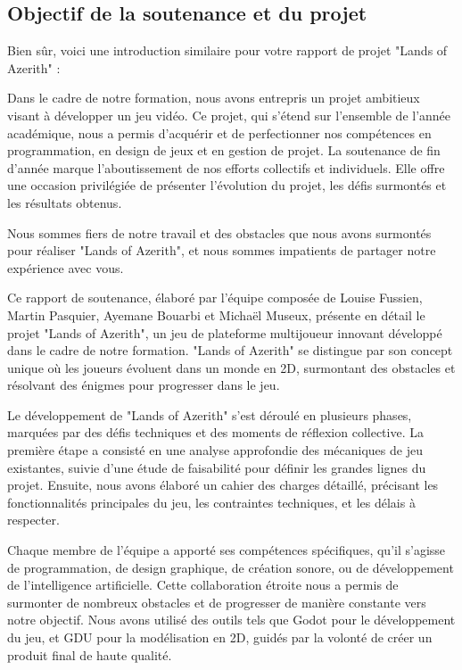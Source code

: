 

\subsection{Objectif de la soutenance et du projet}

Bien sûr, voici une introduction similaire pour votre rapport de projet "Lands of Azerith" :

Dans le cadre de notre formation, nous avons entrepris un projet ambitieux visant à développer un jeu vidéo. Ce projet, qui s'étend sur l'ensemble de l'année académique, nous a permis d'acquérir et de perfectionner nos compétences en programmation, en design de jeux et en gestion de projet. La soutenance de fin d'année marque l'aboutissement de nos efforts collectifs et individuels. Elle offre une occasion privilégiée de présenter l'évolution du projet, les défis surmontés et les résultats obtenus.

Nous sommes fiers de notre travail et des obstacles que nous avons surmontés pour réaliser "Lands of Azerith", et nous sommes impatients de partager notre expérience avec vous.


Ce rapport de soutenance, élaboré par l'équipe composée de Louise Fussien, Martin Pasquier, Ayemane Bouarbi et Michaël Museux, présente en détail le projet "Lands of Azerith", un jeu de plateforme multijoueur innovant développé dans le cadre de notre formation. "Lands of Azerith" se distingue par son concept unique où les joueurs évoluent dans un monde en 2D, surmontant des obstacles et résolvant des énigmes pour progresser dans le jeu.


Le développement de "Lands of Azerith" s'est déroulé en plusieurs phases, marquées par des défis techniques et des moments de réflexion collective. La première étape a consisté en une analyse approfondie des mécaniques de jeu existantes, suivie d'une étude de faisabilité pour définir les grandes lignes du projet. Ensuite, nous avons élaboré un cahier des charges détaillé, précisant les fonctionnalités principales du jeu, les contraintes techniques, et les délais à respecter.

Chaque membre de l'équipe a apporté ses compétences spécifiques, qu'il s'agisse de programmation, de design graphique, de création sonore, ou de développement de l'intelligence artificielle. Cette collaboration étroite nous a permis de surmonter de nombreux obstacles et de progresser de manière constante vers notre objectif. Nous avons utilisé des outils tels que Godot pour le développement du jeu, et GDU pour la modélisation en 2D, guidés par la volonté de créer un produit final de haute qualité.

